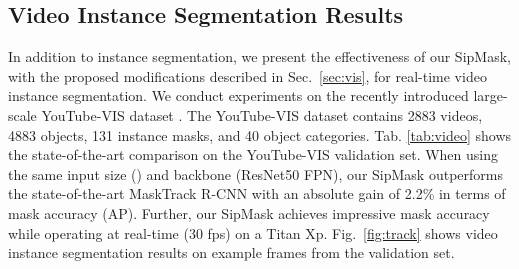 \documentclass[runningheads]{llncs}
\begin{document}
\subsection{Video Instance Segmentation Results}
\label{exp:vis}
In addition to instance segmentation, we present the effectiveness of our SipMask, with the proposed modifications described in Sec.~\ref{sec:vis}, for real-time video instance segmentation. We conduct experiments on the recently introduced large-scale YouTube-VIS dataset \cite{Yang_VIS_ICCV_2019}. The YouTube-VIS dataset contains  2883 videos, 4883 objects, 131 instance masks, and 40 object categories. Tab. \ref{tab:video} shows
the state-of-the-art comparison on the YouTube-VIS validation set. When using the same input size () and backbone (ResNet50 FPN), our SipMask outperforms the state-of-the-art MaskTrack R-CNN \cite{Yang_VIS_ICCV_2019} with an absolute gain of 2.2\% in terms of mask accuracy (AP). Further, our SipMask achieves impressive mask accuracy while operating at real-time (30 fps) on a Titan Xp. Fig.~\ref{fig:track} shows video instance segmentation results on example frames from the validation set.


\begin{table}[t!]
\centering
\caption{Comparison with state-of-the-art video instance segmentation methods on YouTube-VIS validation set. Results are reported in terms of mask accuracy and recall.}
\label{tab:video}
\end{table}
\end{document}
